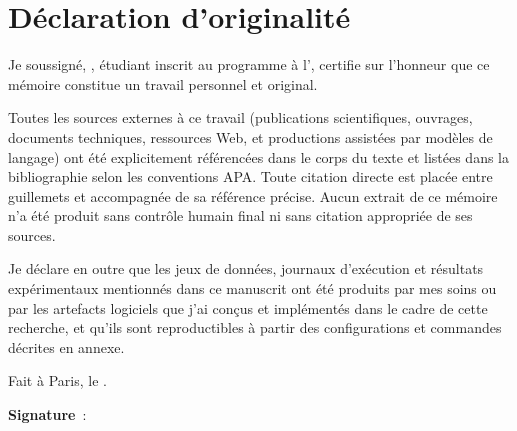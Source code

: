 \chapter*{D\'eclaration d'originalit\'e}

Je soussign\'e, \textbf{\memoireAuteur}, \'etudiant inscrit au programme \memoireProgramme{}
\`a l'\memoireEcole, certifie sur l'honneur que ce m\'emoire constitue un travail
personnel et original.

Toutes les sources externes \`a ce travail (publications scientifiques, ouvrages,
documents techniques, ressources Web, et productions assist\'ees par mod\`eles de
langage) ont \'et\'e explicitement r\'ef\'erenc\'ees dans le corps du texte et list\'ees
dans la bibliographie selon les conventions APA. Toute citation directe est plac\'ee
entre guillemets et accompagn\'ee de sa r\'ef\'erence pr\'ecise. Aucun extrait de ce
m\'emoire n'a \'et\'e produit sans contr\^ole humain final ni sans citation appropri\'ee
de ses sources.

Je d\'eclare en outre que les jeux de donn\'ees, journaux d'ex\'ecution et
r\'esultats exp\'erimentaux mentionn\'es dans ce manuscrit ont \'et\'e produits par mes
soins ou par les artefacts logiciels que j'ai con\c{c}us et impl\'ement\'es dans le
cadre de cette recherche, et qu'ils sont reproductibles \`a partir des
configurations et commandes d\'ecrites en annexe.

\vspace{2cm}

\noindent Fait \`a Paris, le \memoireDate.

\vspace{1.5cm}

\noindent\textbf{Signature}~:

\vspace{2cm}
\cleardoublepage

